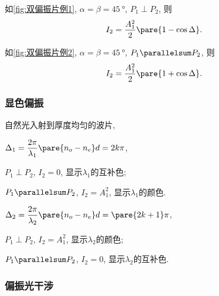 \documentclass{ctexart}
\begin{document}
\begin{sample}
    \begin{ex}
        如\cref{fig:双偏振片例1}, $\alpha = \beta = \SI{45}{\degree}$, $P_1\perp P_2$, 则
        \[ I_2 = \frac{A_1^2}{2}\pare{1-\cos\Delta}. \]
    \end{ex}
\end{sample}
\begin{sample}
    \begin{ex}
        如\cref{fig:双偏振片例2}, $\alpha = \beta = \SI{45}{\degree}$, $P_1 \parallelsum P_2$, 则
        \[ I_2 = \frac{A_1^2}{2}\pare{1+\cos\Delta}. \]
    \end{ex}
\end{sample}


\subsubsection{显色偏振} %
\label{ssub:显色偏振}

自然光入射到厚度均匀的波片,
\begin{cenum}
    \item $\displaystyle \Delta_1 = \frac{2\pi}{\lambda_1}\pare{n_o - n_e}d = 2k\pi$,
    \begin{cenum}
        \item $P_1\perp P_2$, $I_2 = 0$, 显示$\lambda_1$的互补色;
        \item $P_1\parallelsum P_2$, $I_2 = A_1^2$, 显示$\lambda_1$的颜色.
    \end{cenum}
    \item $\displaystyle \Delta_2 = \frac{2\pi}{\lambda_2}\pare{n_o -  n_e}d = \pare{2k+1}\pi$,
    \begin{cenum}
        \item $P_1\perp P_2$, $I_2 = A_1^2$, 显示$\lambda_2$的颜色;
        \item $P_1\parallelsum P_2$, $I_2 = 0$, 显示$\lambda_2$的互补色.
    \end{cenum}
\end{cenum} 


\subsubsection{偏振光干涉} %
\label{ssub:偏振光干涉}
\end{document}
